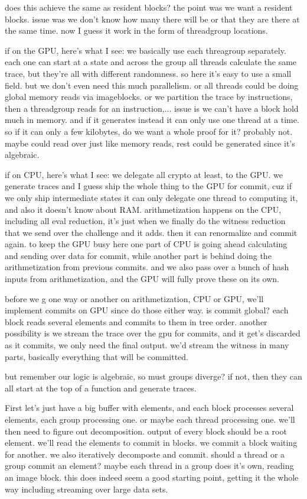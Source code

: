 does this achieve the same as resident blocks?
the point was we want a resident blocks. issue was we don't know how many there will be or that they are there at the same time. now I guess it work in the form of threadgroup locations.

if on the GPU, here's what I see:
we basically use each threagroup separately. each one can start at a state and across the group all threads calculate the same trace, but they're all with different randomness. so here it's easy to use a small field. but we don't even need this much parallelism. 
or all threads could be doing global memory reads via imageblocks. 
or we partition the trace by instructions, then a threadgroup reads for an instruction,...
issue is we can't have a block hold much in memory. and if it generates instead it can only use one thread at a time. so if it can only a few kilobytes, do we want a whole proof for it? probably not.
maybe could read over just like memory reads, rest could be generated since it's algebraic. 


if on CPU, here's what I see:
we delegate all crypto at least, to the GPU.
we generate traces and I guess ship the whole thing to the GPU for commit, cuz if we only ship intermediate states it can only delegate one thread to computing it, and also it doesn't know about RAM.
arithmetization happens on the CPU, including all eval reduction, it's just when we finally do the witness reduction that we send over the challenge and it adds. then it can renormalize and commit again.
to keep the GPU busy here one part of CPU is going ahead calculating and sending over data for commit, while another part is behind doing the arithmetization from previous commits. 
and we also pass over a bunch of hash inputs from arithmetization, and the GPU will fully prove these on its own. 

before we g one way or another on arithmetization, CPU or GPU, we'll implement commits on GPU since do those either way.
is commit global? each block reads several elements and commits to them in tree order. 
another possibility is we stream the trace over the gpu for commits, and it get's discarded as it commits, we only need the final output. we'd stream the witness in many parts, basically everything that will be committed.

but remember our logic is algebraic, so must groups diverge?
if not, then they can all start at the top of a function and generate traces. 

First let's just have a big buffer with elements, and each block processes several elements, each group processing one. or maybe each thread processing one. we'll then need to figure out decomposition. output of every block should be a root element.
we'll read the elements to commit in blocks. we commit a block waiting for another. we also iteratively decomposte and commit. 
should a thread or a group commit an element? maybe each thread in a group does it's own, reading an image block. 
this does indeed seem a good starting point, getting it the whole way including streaming over large data sets. 

